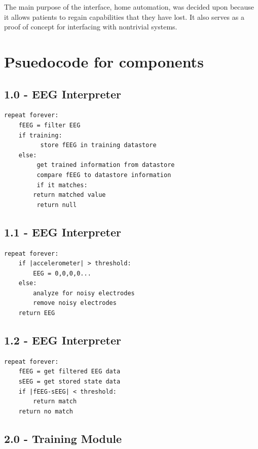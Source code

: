 \documentclass{article}
\begin{document}
The main purpose of the interface, home automation, was decided upon because
it allows patients to regain capabilities that they have lost. It also
serves as a proof of concept for interfacing with nontrivial systems.

\newpage

\section{Psuedocode for components}

\subsection*{1.0 - EEG Interpreter}

\begin{lstlisting}
repeat forever:
    fEEG = filter EEG
    if training:
          store fEEG in training datastore
    else:
         get trained information from datastore
         compare fEEG to datastore information
         if it matches:
		return matched value
         return null
\end{lstlisting}

\subsection*{1.1 - EEG Interpreter}

\begin{lstlisting}
repeat forever:
    if |accelerometer| > threshold:
        EEG = 0,0,0,0...
    else:
        analyze for noisy electrodes
        remove noisy electrodes
    return EEG
\end{lstlisting}

\subsection*{1.2 - EEG Interpreter}

\begin{lstlisting}
repeat forever:
    fEEG = get filtered EEG data
    sEEG = get stored state data
    if |fEEG-sEEG| < threshold:
        return match
    return no match

\end{lstlisting}

\subsection*{2.0 - Training Module}
\end{document}
